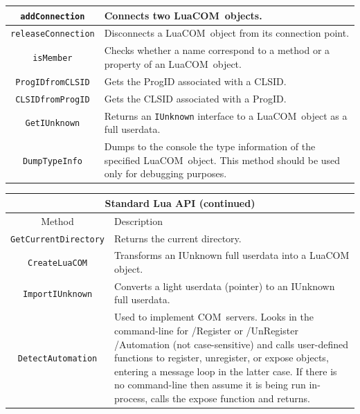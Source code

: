 \documentclass[11pt,a4paper,english]{report}
\newcommand{\ttext}[1]{#1}
\newcommand{\ttitle}[1]{#1}
\newcommand{\tlinetitB}[2]{#1 & #2 \\ \hline \hline}
\newcommand{\ttext}[1]{{\raggedright #1 \\}}
\newcommand{\ttitle}[1]{\begin{minipage}{\colA cm} \centering \bf #1 \end{minipage}}
\newcommand{\tlinetitB}[2]{\ttitle{#1} & \ttitle{#2} \\ \hline \hline}
\newcommand{\ident}[1]{\mbox{\texttt{#1}}}
\newcommand{\techname}[1]{\mbox{#1}}
\newcommand{\com}{\techname{COM}}
\newcommand{\luacom}{\techname{LuaCOM}}
\begin{document}
\begin{center}
\begin{tabular}{|c|p{7cm}|}
  \verb+addConnection+
    & \ttext{Connects two \luacom\ objects.} \\ \hline

  \verb+releaseConnection+
    & \ttext{Disconnects a \luacom\ object from its
    connection point.} \\ \hline

  \verb+isMember+
    & \ttext{Checks whether a name correspond to a method
    or a property of an \luacom\ object.} \\ \hline

  \verb+ProgIDfromCLSID+
    & \ttext{Gets the ProgID associated with a CLSID.} \\ \hline

  \verb+CLSIDfromProgID+
    & \ttext{Gets the CLSID associated with a ProgID.} \\ \hline

  \verb+GetIUnknown+
    & \ttext{Returns an \ident{IUnknown} interface to a \luacom\
    object as a full userdata.} \\ \hline

  \verb+DumpTypeInfo+ & \ttext{Dumps to the console the type
    information of the specified \luacom\ object. This method should
    be used only for debugging purposes.} \\ \hline

  \end{tabular}
  \end{center}

  \begin{center}
  \begin{tabular}{|c|p{7cm}|}

  \multicolumn{2}{c}{\large Standard Lua API (continued)} \\
  \hline

  \tlinetitB{Method}{Description}

  \verb+GetCurrentDirectory+ & \ttext{Returns the current directory.} \\ \hline

  \verb+CreateLuaCOM+ & \ttext{Transforms an IUnknown full userdata
  into a LuaCOM object.} \\ \hline

  \verb+ImportIUnknown+ & \ttext{Converts a light userdata (pointer)
  to an IUnknown full userdata.} \\ \hline

  \verb+DetectAutomation+ & \ttext{Used to implement \com\ servers.
  Looks in the command-line for /Register or /UnRegister /Automation (not case-sensitive)
  and calls user-defined functions to register, unregister, or expose objects, entering
  a message loop in the latter case. If there is no command-line then assume it is being
  run in-process, calls the expose function and returns.
  } \\ \hline

  \end{tabular}
  \end{center}
\end{document}
